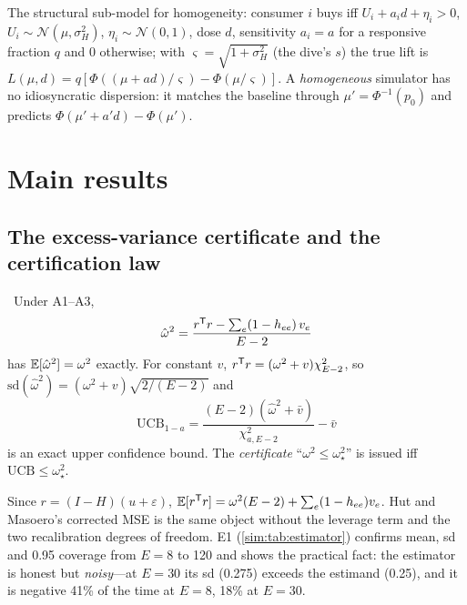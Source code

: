 The structural sub-model for homogeneity: consumer $i$ buys iff $U_i + a_i d + \eta_i > 0$, $U_i \sim \mathcal N(\mu, \sigma_H^2)$, $\eta_i \sim \mathcal N(0, 1)$, dose $d$, sensitivity $a_i = a$ for a responsive fraction $q$ and 0 otherwise; with $\varsigma = \sqrt{1 + \sigma_H^2}$ (the dive's $s$) the true lift is $L(\mu, d) = q[\Phi((\mu + ad)/\varsigma) - \Phi(\mu/\varsigma)]$. A \emph{homogeneous} simulator has no idiosyncratic dispersion: it matches the baseline through $\mu' = \Phi^{-1}(p_0)$ and predicts $\Phi(\mu' + a'd) - \Phi(\mu')$.

\section{Main results}

\subsection{The excess-variance certificate and the certification law}

\begin{proposition}
\label{sim:prop:estimator}
\tagEstablished\ Under A1--A3,
\begin{equation}
\hat\omega^2 = \frac{r^{\mathsf{T}} r - \sum_e (1 - h_{ee})\,v_e}{E - 2}
\label{sim:eq:estimator}
\end{equation}
has $\mathbb{E}[\hat\omega^2] = \omega^2$ exactly. For constant $v$, $r^{\mathsf{T}} r = (\omega^2 + v)\chi^2_{E-2}$, so $\mathrm{sd}(\hat\omega^2) = (\omega^2 + v)\sqrt{2/(E-2)}$ and
\begin{equation}
\mathrm{UCB}_{1-a} = \frac{(E-2)(\hat\omega^2 + \bar v)}{\chi^2_{a, E-2}} - \bar v
\label{sim:eq:ucb}
\end{equation}
is an exact upper confidence bound. The \emph{certificate} ``$\omega^2 \le \omega_\star^2$'' is issued iff $\mathrm{UCB} \le \omega_\star^2$.
\end{proposition}

Since $r = (I - H)(u + \varepsilon)$, $\mathbb{E}[r^{\mathsf{T}} r] = \omega^2(E - 2) + \sum_e(1 - h_{ee})v_e$. Hut and Masoero's corrected MSE is the same object without the leverage term and the two recalibration degrees of freedom. E1 (\cref{sim:tab:estimator}) confirms mean, sd and 0.95 coverage from $E = 8$ to 120 and shows the practical fact: the estimator is honest but \emph{noisy}---at $E = 30$ its sd (0.275) exceeds the estimand (0.25), and it is negative 41\% of the time at $E = 8$, 18\% at $E = 30$.

